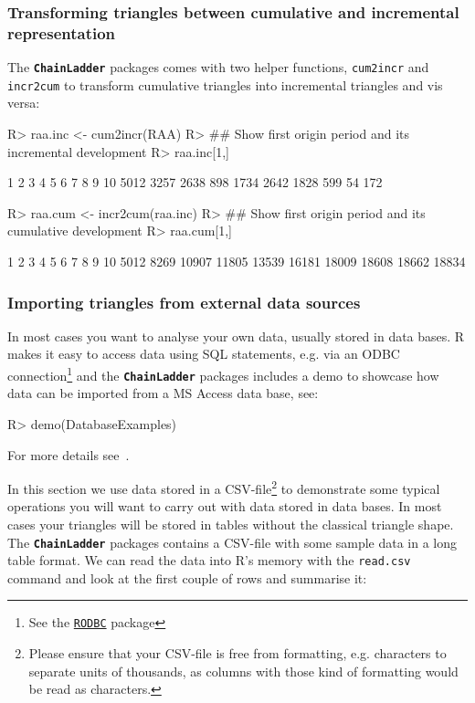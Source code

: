 \documentclass{article}
\newcommand{\chainladder}{\textbf{\texttt{ChainLadder}} }
\begin{document}
\subsubsection{Transforming triangles between cumulative and
  incremental representation}
The \chainladder packages comes with two helper functions,
\texttt{cum2incr} and \texttt{incr2cum} to transform
cumulative triangles into incremental triangles and vis versa:
\begin{Schunk}
\begin{Sinput}
R> raa.inc <- cum2incr(RAA)
R> ## Show first origin period and its incremental development
R> raa.inc[1,]
\end{Sinput}
\begin{Soutput}
   1    2    3    4    5    6    7    8    9   10 
5012 3257 2638  898 1734 2642 1828  599   54  172 
\end{Soutput}
\begin{Sinput}
R> raa.cum <- incr2cum(raa.inc)
R> ## Show first origin period and its cumulative development
R> raa.cum[1,]
\end{Sinput}
\begin{Soutput}
    1     2     3     4     5     6     7     8     9    10 
 5012  8269 10907 11805 13539 16181 18009 18608 18662 18834 
\end{Soutput}
\end{Schunk}

\subsubsection{Importing triangles from external data sources}
In most cases you want to analyse your own data, usually stored in
data bases. R makes it easy to access data using SQL statements,
e.g. via an ODBC connection\footnote{See the
  \href{http://cran.r-project.org/package=RODBC}{\texttt{RODBC}}
  package} and the \chainladder packages includes a demo to showcase
how data can be imported from a MS Access data base, see: 
\begin{Schunk}
\begin{Sinput}
R> demo(DatabaseExamples)
\end{Sinput}
\end{Schunk}
For more details see~\cite{Rdata}.

In this section we use data stored in a CSV-file\footnote{Please
  ensure that your CSV-file is free from formatting, e.g. characters to
  separate units of thousands, as columns with those kind of
  formatting would be read as characters.} to demonstrate some
typical operations you will want to carry out with data stored in data bases.
In most cases your triangles will be stored in tables without the
classical triangle shape. The \chainladder packages contains a
CSV-file with some sample data in a long table format. We can read the
data into R's memory with the \texttt{read.csv} command and look at
the first couple of rows and summarise it:
\end{document}
